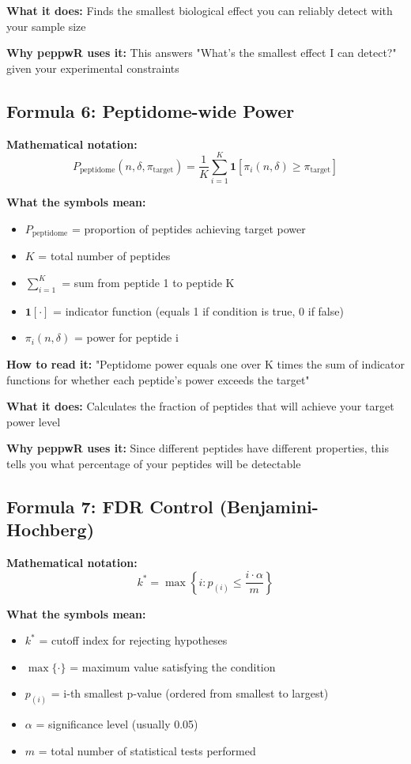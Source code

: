\documentclass[11pt]{article}
\begin{document}
\textbf{What it does:} Finds the smallest biological effect you can reliably detect with your sample size

\textbf{Why peppwR uses it:} This answers "What's the smallest effect I can detect?" given your experimental constraints

\subsection{Formula 6: Peptidome-wide Power}

\textbf{Mathematical notation:}
\[P_{\text{peptidome}}(n, \delta, \pi_{\text{target}}) = \frac{1}{K}\sum_{i=1}^{K} \mathbf{1}[\pi_i(n, \delta) \geq \pi_{\text{target}}]\]

\textbf{What the symbols mean:}
\begin{itemize}
\item $P_{\text{peptidome}}$ = proportion of peptides achieving target power
\item $K$ = total number of peptides
\item $\sum_{i=1}^{K}$ = sum from peptide 1 to peptide K
\item $\mathbf{1}[\cdot]$ = indicator function (equals 1 if condition is true, 0 if false)
\item $\pi_i(n, \delta)$ = power for peptide i
\end{itemize}

\textbf{How to read it:} "Peptidome power equals one over K times the sum of indicator functions for whether each peptide's power exceeds the target"

\textbf{What it does:} Calculates the fraction of peptides that will achieve your target power level

\textbf{Why peppwR uses it:} Since different peptides have different properties, this tells you what percentage of your peptides will be detectable

\subsection{Formula 7: FDR Control (Benjamini-Hochberg)}

\textbf{Mathematical notation:}
\[k^* = \max\left\{i : p_{(i)} \leq \frac{i \cdot \alpha}{m}\right\}\]

\textbf{What the symbols mean:}
\begin{itemize}
\item $k^*$ = cutoff index for rejecting hypotheses
\item $\max\{\cdot\}$ = maximum value satisfying the condition
\item $p_{(i)}$ = i-th smallest p-value (ordered from smallest to largest)
\item $\alpha$ = significance level (usually 0.05)
\item $m$ = total number of statistical tests performed
\end{itemize}
\end{document}
